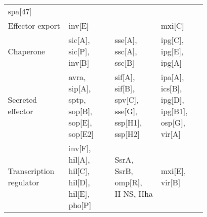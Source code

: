 \begin{table}
\begin{tabular}{L{0.2\linewidth}L{0.2\linewidth}L{0.2\linewidth}L{0.2\linewidth}}
      \acrshort{spa}[47] \\
    Effector export &
      \acrshort{inv}[E] &
      &
      \acrshort{mxi}[C] \\
    Chaperone &
      \acrshort{sic}[A], \acrshort{sic}[P], \acrshort{inv}[B] &
      \acrshort{sse}[A], \acrshort{ssc}[A], \acrshort{ssc}[B] &
      \acrshort{ipg}[C], \acrshort{ipg}[E], \acrshort{ipg}[A] \\
    Secreted effector &
      \acrshort{avra}, \acrshort{sip}[A], \acrshort{sptp}, \acrshort{sop}[B], \acrshort{sop}[E], \acrshort{sop}[E2] &
      \acrshort{sif}[A], \acrshort{sif}[B], \acrshort{spv}[C], \acrshort{sse}[G], \acrshort{ssp}[H1], \acrshort{ssp}[H2] &
      \acrshort{ipa}[A], \acrshort{ics}[B], \acrshort{ipg}[D], \acrshort{ipg}[B1], \acrshort{osp}[G], \acrshort{vir}[A] \\
    Transcription regulator &
      \acrshort{inv}[F], \acrshort{hil}[A], \acrshort{hil}[C], \acrshort{hil}[D], \acrshort{hil}[E], \acrshort{pho}[P] &
      SsrA, SsrB, \acrshort{omp}[R], H-NS, Hha &
      \acrshort{mxi}[E], \acrshort{vir}[B] \\
      \hline
  \end{tabular}
\end{table}

